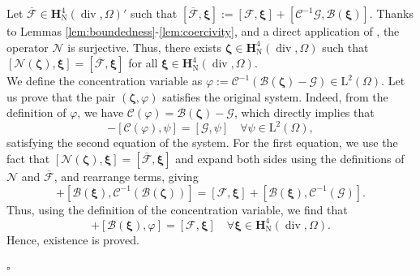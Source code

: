 \documentclass[fleqn,a4paper]{cas-sc}
\newcommand\vdiv{\mathop{\mathrm{div}}\nolimits}
\newcommand{\bxi}{\boldsymbol{\xi}}
\newcommand{\bzeta}{\boldsymbol{\zeta}}
\newcommand{\0}{\boldsymbol{0}}
\newcommand\cC{\mathcal{C}}
\newcommand\cG{\mathcal{G}}
\newcommand\cF{\mathcal{F}}
\newcommand\bH{\mathbf{H}}
\newcommand\rL{\mathrm{L}}
\newcommand\bsigma{\boldsymbol{\sigma}}
\numberwithin{equation}{section}
\numberwithin{figure}{section}
\newenvironment{proof}{\noindent{\it Proof.}}{\hfill$\square$}
\begin{document}
\begin{proof}
     Let $\overline{\cF} \in \bH^{4}_{\mathrm{N}}(\vdiv,\Omega)'$ such that $[\overline{\cF}, \bxi] := [\cF, \bxi] + [\cC^{-1}\cG, \mathcal{B}(\bxi)]$. Thanks to Lemmas \ref{lem:boundedness}-\ref{lem:coercivity}, and a direct application of \cite[Corollary 2.2]{showalter1997}, the operator $\mathcal{N}$ is surjective. Thus, there exists $\bzeta \in \bH^{4}_{\mathrm{N}}(\vdiv,\Omega)$ such that $[\mathcal{N}(\bzeta), \bxi] = [\overline{\cF}, \bxi]$ for all $\bxi \in \bH^{4}_{\mathrm{N}}(\vdiv,\Omega)$.\\ 
    We define the concentration variable as $\varphi := \cC^{-1}(\mathcal{B}(\bzeta) - \cG) \in \rL^2(\Omega)$. 
    Let us prove that the pair $(\bzeta, \varphi)$ satisfies the original system. Indeed, from the definition of $\varphi$, we have $\cC(\varphi) = \mathcal{B}(\bzeta) - \cG$, which directly implies that
    \begin{equation*}
        [\mathcal{B}(\bzeta), \psi] - [\cC(\varphi), \psi] = [\cG, \psi] \quad \forall \psi \in \rL^2(\Omega),
    \end{equation*}
    satisfying the second equation of the system.
   For the first equation, we use the fact that $[\mathcal{N}(\bzeta), \bxi] = [\overline{\cF}, \bxi]$ and expand both sides using the definitions of $\mathcal{N}$ and $\overline{\cF}$, and rearrange terms, giving 
    \begin{equation*}
        [\mathcal{A}_{\widehat{\bsigma}}(\bzeta), \bxi] + [\mathcal{B}(\bxi), \cC^{-1}(\mathcal{B}(\bzeta))] = [\cF, \bxi] + [\mathcal{B}(\bxi), \cC^{-1}(\cG)].
    \end{equation*}
    Thus, using the definition of the concentration variable, we find that
    \begin{equation*}
        [\mathcal{A}_{\widehat{\bsigma}}(\bzeta), \bxi] + [\mathcal{B}(\bxi), \varphi] = [\cF, \bxi] \quad \forall \bxi \in \bH^{4}_{\mathrm{N}}(\vdiv,\Omega).
    \end{equation*}
    Hence, existence is proved.
    

\end{proof}
\end{document}
